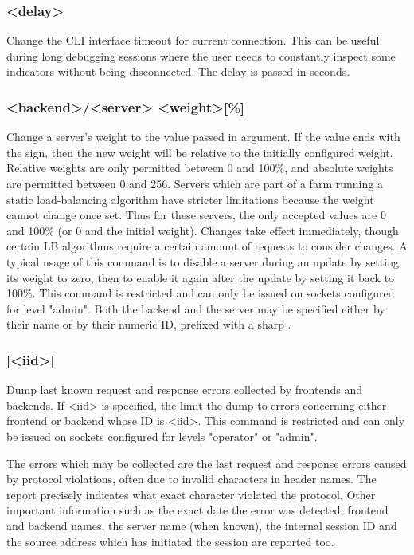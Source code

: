\subsubsection[set timeout cli]{ <delay>}

  Change the CLI interface timeout for current connection. This can be useful
  during long debugging sessions where the user needs to constantly inspect
  some indicators without being disconnected. The delay is passed in seconds.

\subsubsection[set weight]{ <backend>/<server> <weight>[\%]}

  Change a server's weight to the value passed in argument. If the value ends
  with the \chr{\%} sign, then the new weight will be relative to the initially
  configured weight. Relative weights are only permitted between 0 and 100\%,
  and absolute weights are permitted between 0 and 256. Servers which are part
  of a farm running a static load-balancing algorithm have stricter limitations
  because the weight cannot change once set. Thus for these servers, the only
  accepted values are 0 and 100\% (or 0 and the initial weight). Changes take
  effect immediately, though certain LB algorithms require a certain amount of
  requests to consider changes. A typical usage of this command is to disable
  a server during an update by setting its weight to zero, then to enable it
  again after the update by setting it back to 100\%. This command is restricted
  and can only be issued on sockets configured for level "admin". Both the
  backend and the server may be specified either by their name or by their
  numeric ID, prefixed with a sharp \chr{\#}.

\subsubsection[show errors]{ [<iid>]}

  Dump last known request and response errors collected by frontends and
  backends. If <iid> is specified, the limit the dump to errors concerning
  either frontend or backend whose ID is <iid>. This command is restricted
  and can only be issued on sockets configured for levels "operator" or
  "admin".

  The errors which may be collected are the last request and response errors
  caused by protocol violations, often due to invalid characters in header
  names. The report precisely indicates what exact character violated the
  protocol. Other important information such as the exact date the error was
  detected, frontend and backend names, the server name (when known), the
  internal session ID and the source address which has initiated the session
  are reported too.

